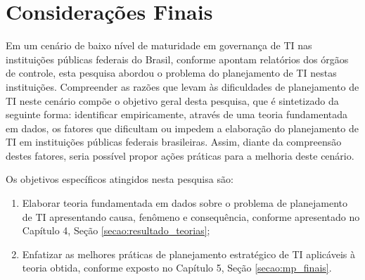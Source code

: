 \chapter{Considerações Finais}






Em um cenário de baixo nível de maturidade em governança de TI nas instituições públicas federais do Brasil, conforme apontam relatórios dos órgãos de controle, esta pesquisa abordou o problema do planejamento de TI nestas instituições. Compreender as razões que levam às dificuldades de planejamento de TI neste cenário compõe o objetivo geral desta pesquisa, que é sintetizado da seguinte forma: identificar empiricamente, através de uma teoria fundamentada em dados, os fatores que dificultam ou impedem a elaboração do planejamento de TI em instituições públicas federais brasileiras. Assim, diante da compreensão destes fatores, seria possível propor ações práticas para a melhoria deste cenário.

Os objetivos específicos atingidos nesta pesquisa são:
\begin{enumerate}
\item Elaborar teoria fundamentada em dados sobre o problema de planejamento de TI apresentando causa, fenômeno e consequência, conforme apresentado no Capítulo 4, Seção \ref{secao:resultado_teorias};
\item Enfatizar as melhores práticas de planejamento estratégico de TI aplicáveis à teoria obtida, conforme exposto no Capítulo 5, Seção \ref{secao:mp_finais}. 
\end{enumerate}

